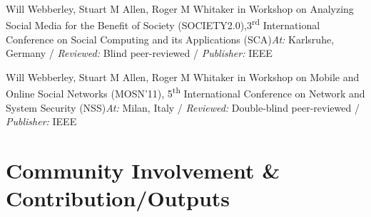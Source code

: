 \documentclass[11pt,a4paper,sans]{moderncv} %
\begin{document}
		{\newline Will Webberley, Stuart M Allen, Roger M Whitaker}
		{\newline in Workshop on Analyzing Social Media for the Benefit of Society (SOCIETY2.0),\newline{}3\textsuperscript{rd} International Conference on Social Computing and its Applications (SCA)}{}{\textit{At:} Karlsruhe, Germany / \textit{Reviewed:} Blind peer-reviewed / \textit{Publisher:} IEEE}
	
		{\newline Will Webberley, Stuart M Allen, Roger M Whitaker}
		{\newline in Workshop on Mobile and Online Social Networks (MOSN'11),\newline{} 5\textsuperscript{th} International Conference on Network and System Security (NSS)}{}{\textit{At:} Milan, Italy / \textit{Reviewed:} Double-blind peer-reviewed / \textit{Publisher:} IEEE}





\section{Community Involvement \& Contribution/Outputs}
        \begin{itemize}
            
        \end{itemize}
	
\end{document}
